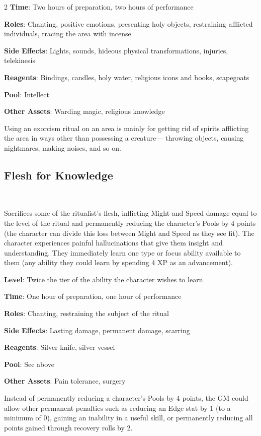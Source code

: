 \begin{multicols}{2}
\textbf{Time}: Two hours of preparation, two hours of performance 

\textbf{Roles}: Chanting, positive emotions, presenting holy objects, restraining afflicted individuals, tracing the area with incense 

\textbf{Side Effects}: Lights, sounds, hideous physical transformations, injuries, telekinesis 

\textbf{Reagents}: Bindings, candles, holy water, religious icons and books, scapegoats 

\textbf{Pool}: Intellect 

\textbf{Other Assets}: Warding magic, religious knowledge 

Using an exorcism ritual on an area is mainly for getting rid of spirits afflicting the area in ways other than possessing a creature— throwing objects, causing nightmares, making noises, and so on.

\subsection{Flesh for Knowledge} 

Sacrifices some of the ritualist’s flesh, inflicting Might and Speed damage equal to the level of the ritual and permanently reducing the character’s Pools by 4 points (the character can divide this loss between Might and Speed as they see fit). The character experiences painful hallucinations that give them insight and understanding. They immediately learn one type or focus ability available to them (any ability they could learn by spending 4 XP as an advancement). 

\textbf{Level}: Twice the tier of the ability the character wishes to learn 

\textbf{Time}: One hour of preparation, one hour of performance 

\textbf{Roles}: Chanting, restraining the subject of the ritual 

\textbf{Side Effects}: Lasting damage, permanent damage, scarring 

\textbf{Reagents}: Silver knife, silver vessel 

\textbf{Pool}: See above 

\textbf{Other Assets}: Pain tolerance, surgery 

Instead of permanently reducing a character’s Pools by 4 points, the GM could allow other permanent penalties such as reducing an Edge stat by 1 (to a minimum of 0), gaining an inability in a useful skill, or permanently reducing all points gained through recovery rolls by 2.



\end{multicols}
